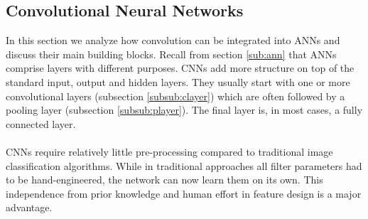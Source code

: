 \documentclass[a4paper, 11pt, twoside, openright]{article}
\begin{document}
\subsection{Convolutional Neural Networks} \label{sub:cnn}
In this section we analyze how convolution can be integrated into ANNs and discuss their main building blocks. Recall from section \ref{sub:ann} that ANNs comprise layers with different purposes. CNNs add more structure on top of the standard input, output and hidden layers. They usually start with one or more convolutional layers (subsection \ref{subsub:clayer}) which are often followed by a pooling layer (subsection \ref{subsub:player}). The final layer is, in most cases, a fully connected layer.
\\ \\
CNNs require relatively little pre-processing compared to traditional image classification algorithms. While in traditional approaches all filter parameters had to be hand-engineered, the network can now learn them on its own. This independence from prior knowledge and human effort in feature design is a major advantage.
\end{document}
